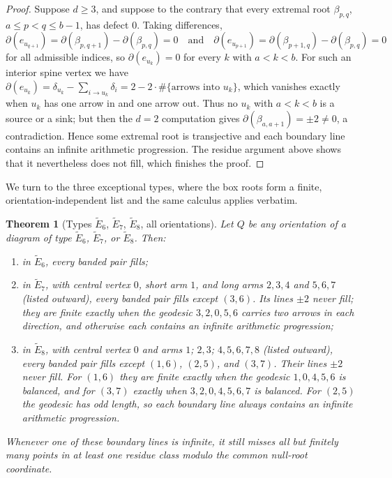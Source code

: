 \documentclass[11pt, a4paper]{amsart}
\newtheorem{theorem}{Theorem}[section]
\theoremstyle{definition}
\begin{document}
\begin{proof}
Suppose $d \geq 3$, and suppose to the contrary that every extremal root
$\beta_{p, q}$, $a \leq p < q \leq b - 1$, has defect $0$. Taking
differences,
\[
  \partial(e_{u_{q+1}}) = \partial(\beta_{p, q+1}) - \partial(\beta_{p, q})
  = 0
  \quad\text{and}\quad
  \partial(e_{u_{p+1}}) = \partial(\beta_{p+1, q}) - \partial(\beta_{p, q})
  = 0
\]
for all admissible indices, so $\partial(e_{u_k}) = 0$ for every $k$ with
$a < k < b$. For such an interior spine vertex we have $\partial(e_{u_k}) =
\delta_{u_k} - \sum_{i \to u_k} \delta_i = 2 - 2 \cdot \#\{\text{arrows
into } u_k\}$, which vanishes exactly when $u_k$ has one arrow in and one
arrow out. Thus no $u_k$ with $a < k < b$ is a source or a sink; but then
the $d = 2$ computation gives $\partial(\beta_{a, a+1}) = \pm 2 \neq 0$, a
contradiction. Hence some extremal root is transjective and each boundary
line contains an infinite arithmetic progression. The residue argument
above shows that it nevertheless does not fill, which finishes the proof.
\end{proof}

We turn to the three exceptional types, where the box roots form a finite,
orientation-independent list and the same calculus applies verbatim.

\begin{theorem}[Types $\widetilde{E}_6$, $\widetilde{E}_7$,
$\widetilde{E}_8$, all orientations]
\label{thm:E_classification}
Let $Q$ be any orientation of a diagram of type $\widetilde{E}_6$,
$\widetilde{E}_7$, or $\widetilde{E}_8$. Then:
\begin{enumerate}[label=\textup{(\arabic*)}]
\item in $\widetilde{E}_6$, every banded pair fills;
\item in $\widetilde{E}_7$, with central vertex $0$, short arm $1$, and
  long arms $2, 3, 4$ and $5, 6, 7$ \textup{(}listed outward\textup{)},
  every banded pair fills except $(3, 6)$. Its lines $\pm 2$ never fill;
  they are finite exactly when the geodesic $3, 2, 0, 5, 6$ carries two
  arrows in each direction, and otherwise each contains an infinite
  arithmetic progression;
\item in $\widetilde{E}_8$, with central vertex $0$ and arms $1$; $2, 3$;
  $4, 5, 6, 7, 8$ \textup{(}listed outward\textup{)}, every banded pair
  fills except $(1, 6)$, $(2, 5)$, and $(3, 7)$. Their lines $\pm2$ never
  fill. For $(1,6)$ they are finite exactly when the geodesic
  $1,0,4,5,6$ is balanced, and for $(3,7)$ exactly when
  $3,2,0,4,5,6,7$ is balanced. For $(2,5)$ the geodesic has odd length,
  so each boundary line always contains an infinite arithmetic progression.
\end{enumerate}
Whenever one of these boundary lines is infinite, it still misses all but
finitely many points in at least one residue class modulo the common
null-root coordinate.
\end{theorem}
\end{document}
